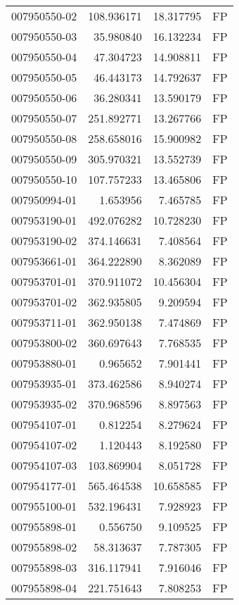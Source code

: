 \begin{tabular}{lrrl}
007950550-02 &  108.936171 &    18.317795 &   FP \\
007950550-03 &   35.980840 &    16.132234 &   FP \\
007950550-04 &   47.304723 &    14.908811 &   FP \\
007950550-05 &   46.443173 &    14.792637 &   FP \\
007950550-06 &   36.280341 &    13.590179 &   FP \\
007950550-07 &  251.892771 &    13.267766 &   FP \\
007950550-08 &  258.658016 &    15.900982 &   FP \\
007950550-09 &  305.970321 &    13.552739 &   FP \\
007950550-10 &  107.757233 &    13.465806 &   FP \\
007950994-01 &    1.653956 &     7.465785 &   FP \\
007953190-01 &  492.076282 &    10.728230 &   FP \\
007953190-02 &  374.146631 &     7.408564 &   FP \\
007953661-01 &  364.222890 &     8.362089 &   FP \\
007953701-01 &  370.911072 &    10.456304 &   FP \\
007953701-02 &  362.935805 &     9.209594 &   FP \\
007953711-01 &  362.950138 &     7.474869 &   FP \\
007953800-02 &  360.697643 &     7.768535 &   FP \\
007953880-01 &    0.965652 &     7.901441 &   FP \\
007953935-01 &  373.462586 &     8.940274 &   FP \\
007953935-02 &  370.968596 &     8.897563 &   FP \\
007954107-01 &    0.812254 &     8.279624 &   FP \\
007954107-02 &    1.120443 &     8.192580 &   FP \\
007954107-03 &  103.869904 &     8.051728 &   FP \\
007954177-01 &  565.464538 &    10.658585 &   FP \\
007955100-01 &  532.196431 &     7.928923 &   FP \\
007955898-01 &    0.556750 &     9.109525 &   FP \\
007955898-02 &   58.313637 &     7.787305 &   FP \\
007955898-03 &  316.117941 &     7.916046 &   FP \\
007955898-04 &  221.751643 &     7.808253 &   FP \\

\end{tabular}
